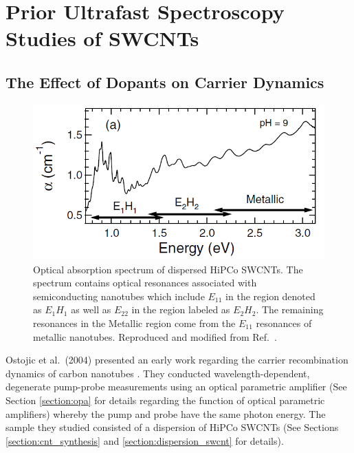 \chapter{Prior Ultrafast Spectroscopy Studies of SWCNTs}

\section{The Effect of Dopants on Carrier Dynamics}

\begin{figure}[ht]
	\centering
	\includegraphics[scale=0.7]{images/chapter_prior_works/abs_gordana}

	\caption{Optical absorption spectrum of dispersed HiPCo SWCNTs. The spectrum contains optical resonances associated with semiconducting nanotubes which include $E_{11}$ in the region denoted as $E_{1} H_{1}$ as well as  $E_{22}$ in the region labeled as $E_{2} H_{2}$. The remaining resonances in the Metallic region come from the $E_{11}$ resonances of metallic nanotubes. Reproduced and modified from Ref.\ \cite{ostojic2004interband}.}

	\label{fig:abs_gordana}
\end{figure}

Ostojic et al.\ (2004) presented an early work regarding the carrier recombination dynamics of carbon nanotubes \cite{ostojic2004interband}. They conducted wavelength-dependent, degenerate pump-probe measurements using an optical parametric amplifier (See Section \ref{section:opa} for details regarding the function of optical parametric amplifiers) whereby the pump and probe have the same photon energy. The sample they studied consisted of a dispersion of HiPCo SWCNTs (See Sections \ref{section:cnt_synthesis} and \ref{section:dispersion_swcnt} for details).

